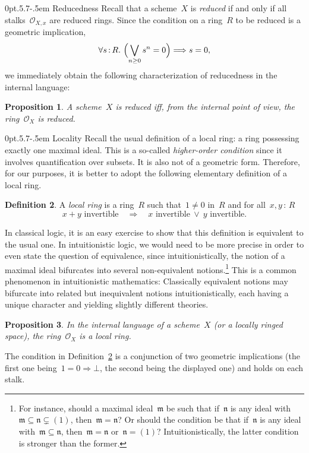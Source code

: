 \documentclass[10pt,reqno,a4paper]{amsbook}
\makeatletter
\theoremstyle{definition}
\newtheorem{defn}{Definition}[section]
\theoremstyle{plain}
\newtheorem{prop}[defn]{Proposition}
\theoremstyle{remark}
\renewcommand{\O}{\mathcal{O}}
\newcommand{\mmm}{\mathfrak{m}}
\newcommand{\nnn}{\mathfrak{n}}
\newcommand{\?}{\,{:}\,}
\renewcommand{\_}{\mathpunct{.}\,}
\renewenvironment{proof}[1][\proofname]{\par
  \pushQED{\qed}%
  \normalfont \topsep6\p@\@plus6\p@\relax
  \trivlist
  \item[\hskip\labelsep
        \itshape
    #1\@addpunct{.}]\ignorespaces
}{%
  \popQED\endtrivlist\@endpefalse
}
\def\subsection{\@startsection{subsection}{2}%
  {0pt}{.5\linespacing\@plus.7\linespacing}{-.5em}%
  {\normalfont\bfseries}}
\makeatother
\begin{document}
\subsection{Reducedness}\label{sect:reducedness} Recall that a scheme~$X$ is \emph{reduced} if and only
if all stalks~$\O_{X,x}$ are reduced rings. Since the condition on a ring~$R$
to be reduced is a geometric implication,
\[ \forall s\?R\_ \Bigl(\bigvee_{n \geq 0} s^n = 0\Bigr) \Longrightarrow s = 0, \]
we immediately obtain the following characterization of reducedness in the
internal language:
\begin{prop}\label{prop:reduced-ring}
A scheme~$X$ is reduced iff, from the internal point of view, the
ring~$\O_X$ is reduced.\end{prop}


\subsection{Locality} Recall the usual definition of a local ring: a ring
possessing exactly one maximal ideal. This is a so-called \emph{higher-order
condition} since it involves quantification over subsets. It is also not of a
geometric form. Therefore, for our purposes, it is better to
adopt the following elementary definition of a local ring.
\begin{defn}\label{defn:local-ring}A \emph{local ring} is a ring~$R$ such that~$1 \neq 0$ in~$R$ and
for all~$x,y \? R$
\[ \text{$x+y$ invertible} \quad\Longrightarrow\quad
  \text{$x$ invertible}\ \vee\ \text{$y$ invertible}. \]
\end{defn}
In classical logic, it is an easy exercise to show that this definition is
equivalent to the usual one. In intuitionistic logic, we would need to be
more precise in order to even state the question of equivalence, since
intuitionistically, the notion of a maximal ideal bifurcates into several
non-equivalent notions.\footnote{For instance, should a maximal ideal~$\mmm$ be
such that if~$\nnn$ is any ideal with~$\mmm \subseteq \nnn \subsetneq (1)$,
then~$\mmm = \nnn$? Or should the condition be that if~$\nnn$ is any ideal
with~$\mmm \subseteq \nnn$, then~$\mmm = \nnn$ or~$\nnn = (1)$?
Intuitionistically, the latter condition is stronger than the former.}
This is a common phenomenon in intuitionistic
mathematics: Classically equivalent notions may bifurcate into related but
inequivalent notions intuitionistically, each having a unique character and
yielding slightly different theories.


\begin{prop}\label{prop:local-ring}
In the internal language of a scheme~$X$ (or a locally ringed
space), the ring~$\O_X$ is a local ring.\end{prop}
\begin{proof}The condition in Definition~\ref{defn:local-ring} is a conjunction of two geometric
implications (the first one being~$1 = 0 \Rightarrow \bot$, the second being
the displayed one) and holds on each stalk.\end{proof}
\end{document}
